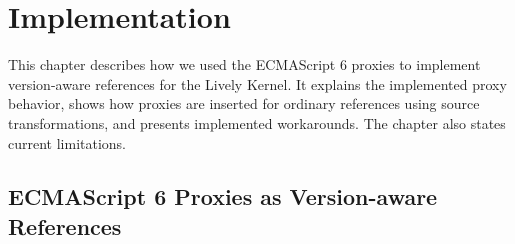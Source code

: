 \chapter{Implementation} \label{chapter:IMPLEMENTATION}

This chapter describes how we used the ECMAScript 6 proxies to implement version-aware references for the Lively Kernel.
It explains the implemented proxy behavior, shows how proxies are inserted for ordinary references using source transformations, and presents implemented workarounds.
The chapter also states current limitations.










\section{ECMAScript 6 Proxies as Version-aware References} \label{sec:IMPLEMENTATION:1}


